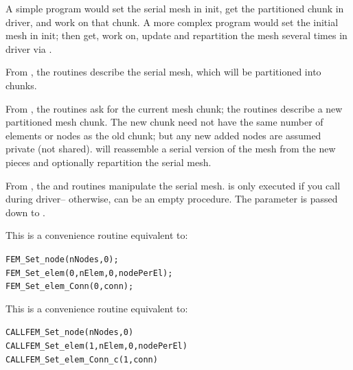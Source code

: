 \documentclass[10pt]{article}
\begin{document}
A simple program would set the serial mesh in init, get the partitioned
chunk in driver, and work on that chunk.  A more complex program would set
the initial mesh in init; then get, work on, update and repartition the mesh
several times in driver via .

From , the  routines describe the serial mesh, which
will be partitioned into chunks.

From , the  routines ask for the current mesh
chunk; the  routines describe a new partitioned mesh chunk.  The
new chunk need not have the same number of elements or nodes as the old chunk;
but any new added nodes are assumed private (not shared).
 will reassemble a serial version of the mesh from the
new pieces and optionally repartition the serial mesh.

From , the  and  routines
manipulate the serial mesh.    is only executed if you call
 during driver-- otherwise,  can be an
empty procedure.  The parameter  is passed down to
.


     This is a convenience routine equivalent to:
\begin{alltt}
          FEM\_Set\_node(nNodes,0);
          FEM\_Set\_elem(0,nElem,0,nodePerEl);
          FEM\_Set\_elem\_Conn(0,conn);
\end{alltt}


     This is a convenience routine equivalent to:
\begin{alltt}
          CALL FEM\_Set\_node(nNodes,0)
          CALL FEM\_Set\_elem(1,nElem,0,nodePerEl)
          CALL FEM\_Set\_elem\_Conn\_c(1,conn)
\end{alltt}

\end{document}
